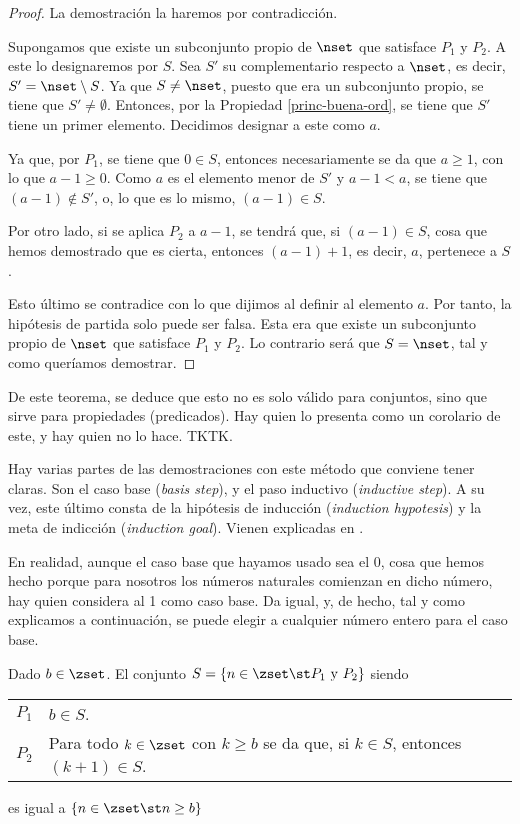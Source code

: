 \begin{proof}
  La demostración la haremos por contradicción.

  Supongamos que existe un subconjunto propio de $\nset$ que satisface $P_1$
  y $P_2$. A este lo designaremos por $S$. Sea $S'$ su complementario
  respecto a $\nset$, es decir, $S' = \nset \setminus S$. Ya que $S \neq
  \nset$, puesto que era un subconjunto propio, se tiene que $S' \neq
  \emptyset$. Entonces, por la Propiedad \ref{princ-buena-ord}, se tiene que
  $S'$ tiene un primer elemento. Decidimos designar a este como $a$.

  Ya que, por $P_1$, se tiene que $0 \in S$, entonces necesariamente se da
  que $a \geq 1$, con lo que $a - 1 \geq 0$. Como $a$ es el elemento menor
  de $S'$ y $a - 1 < a$, se tiene que $(a - 1) \notin S'$, o, lo que es lo
  mismo, $(a - 1) \in S$.

  Por otro lado, si se aplica $P_2$ a $a - 1$, se tendrá que, si $(a - 1)
  \in S$, cosa que hemos demostrado que es cierta, entonces $(a - 1) + 1$,
  es decir, $a$, pertenece a $S$.

  Esto último se contradice con lo que dijimos al definir al elemento $a$.
  Por tanto, la hipótesis de partida solo puede ser falsa. Esta era que
  existe un subconjunto propio de $\nset$ que satisface $P_1$ y $P_2$. Lo
  contrario será que $S = \nset$, tal y como queríamos demostrar.
\end{proof}

De este teorema, se deduce que esto no es solo válido para conjuntos, sino
que sirve para propiedades (predicados). Hay quien lo presenta como un
corolario de este, y hay quien no lo hace. TKTK.

Hay varias partes de las demostraciones con este método que conviene tener
claras. Son el caso base (\emph{basis step}), y el paso inductivo
(\emph{inductive step}). A su vez, este último consta de la hipótesis de
inducción (\emph{induction hypotesis}) y la meta de indicción
(\emph{induction goal}). Vienen explicadas en \cite{idescent-newstead}.


En realidad, aunque el caso base que hayamos usado sea el 0, cosa que hemos
hecho porque para nosotros los números naturales comienzan en dicho número,
hay quien considera al 1 como caso base. Da igual, y, de hecho, tal y como
explicamos a continuación, se puede elegir a cualquier número entero para el
caso base.

\begin{corollary}
  Dado $b \in \zset$. El conjunto $S = \{n \in \zset \st P_1 \ \mathrm{y} \
  P_2\}$ siendo

  \begin{center}
    \begin{tabular}{l p{}}
      $P_1$ & $b \in S$. \\
      $P_2$ & Para todo $k \in \zset$ con $k \geq b$ se da que, si $k \in
        S$, entonces $(k+1) \in S$.
    \end{tabular}
  \end{center}

  \noindent es igual a $\{n \in \zset \st n \geq b\}$
\end{corollary}

